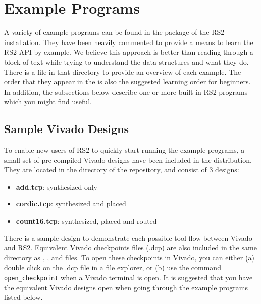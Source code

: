 \newpage
\section{Example Programs} \label{examples}

A variety of example programs can be found in the
 package of the RS2 installation.
They have been heavily commented to provide a means to learn the RS2 API by
example. We believe this approach is better than reading through a block of
text while trying to understand the data structures and what they do.
There is a  file in that directory to provide an overview of
each example. The order that they appear in the  is also the
suggested learning order for beginners. In addition, the subsections below
describe one or more built-in RS2 programs which you might find useful.

\subsection{Sample Vivado Designs}
To enable new users of RS2 to quickly start running the example
programs, a small set of pre-compiled Vivado designs have been included in the
distribution. They are located in the  directory of
the repository, and consist of 3 designs: 
\begin{itemize}
\item \textbf{add.tcp}: synthesized only
\item \textbf{cordic.tcp}: synthesized and placed
\item \textbf{count16.tcp}: synthesized, placed and routed
\end{itemize} 
There is a sample design to demonstrate each possible tool flow between Vivado
and RS2. Equivalent Vivado checkpoints files (.dcp) are also included in
the same directory as , , and 
files. To open these checkpoints in Vivado, you can either (a) double click on
the .dcp file in a file explorer, or (b) use the command
\texttt{open\_checkpoint} when a Vivado terminal is open. It is suggested that
you have the equivalent Vivado designs open when going through the example
programs listed below.

